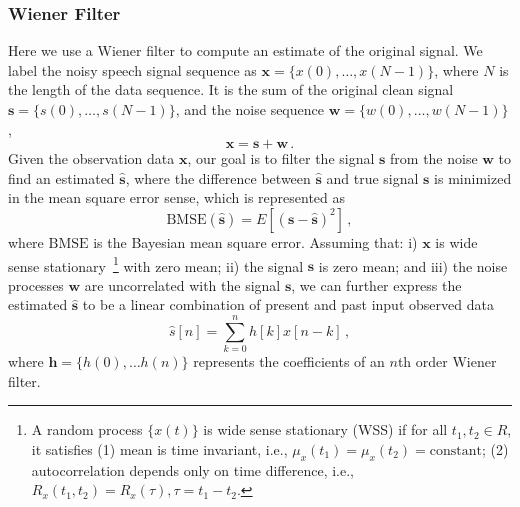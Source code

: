 \documentclass[paper-main.tex]{subfiles}
\begin{document}



\subsubsection{Wiener Filter}

Here we use a Wiener filter to compute an estimate of the original signal. 
We label the noisy speech signal sequence as  $\mathbf{x}=\{x(0),\dots, x(N-1)\}$, where $N$ is the length of the data sequence. 
It is the sum of the original clean signal $\mathbf{s}=\{s(0),\dots,s(N-1)\}$, and the noise sequence $\mathbf{w}=\{w(0),\dots,w(N-1)\}$, 
\begin{equation}
    \mathbf{x}=\mathbf{s}+\mathbf{w}\,.
\end{equation}
Given the observation data $\textbf{x}$, our goal is to filter the signal $\textbf{s}$ from the noise $\textbf{w}$ to find an estimated $\hat{\textbf{s}}$, where the difference between $\hat{\textbf{s}}$ and true signal $\textbf{s}$ is minimized in the mean square error sense, which is represented as
\begin{equation}
\text{BMSE}(\hat{\textbf{s}})=E[(\textbf{s}-\hat{\textbf{s}})^2]\,,
\end{equation}
where $\text{BMSE}$ is the Bayesian mean square error. 
Assuming that: i) $\textbf{x}$ is wide sense stationary~\footnote{
A random process $\{x(t)\}$ is wide sense stationary (WSS) if for all
$t_1,t_2 \in R$, it satisfies (1) mean is time invariant, i.e.,
$\mu_x(t_1)=\mu_x(t_2)=\text{constant}$; (2) autocorrelation depends
only on time difference, i.e., $R_x(t_1,t_2)=R_x(\tau),\tau=t_1-t_2$.} 
with zero mean; ii) the signal $\textbf{s}$ is zero mean; and iii) the noise processes $\textbf{w}$ are uncorrelated with the signal $\textbf{s}$, we can further express the estimated $\hat{\textbf{s}}$ to be a linear combination of present and past input observed data
\begin{equation}
\hat{{s}}[n]=\sum_{k=0}^{n}h[k]x[n-k]\,,
\end{equation}
where $\textbf{h}=\{h(0),\dots h(n)\}$ represents the coefficients of an $n$th order Wiener filter.
\end{document}
